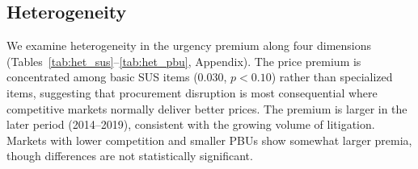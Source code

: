 \subsection{Heterogeneity}
\label{sec:heterogeneity}

We examine heterogeneity in the urgency premium along four dimensions (Tables~\ref{tab:het_sus}--\ref{tab:het_pbu}, Appendix). The price premium is concentrated among basic SUS items (0.030, $p < 0.10$) rather than specialized items, suggesting that procurement disruption is most consequential where competitive markets normally deliver better prices. The premium is larger in the later period (2014--2019), consistent with the growing volume of litigation. Markets with lower competition and smaller PBUs show somewhat larger premia, though differences are not statistically significant.

